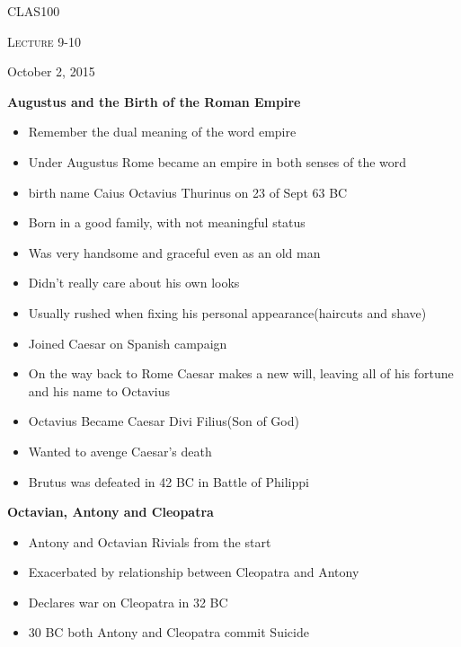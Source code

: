 \documentclass[12pt,a4paper]{report}
\begin{document}
	\centering
	{\scshape\LARGE CLAS100 \par}
	{\scshape\Large Lecture 9-10\par}
	{\large October 2, 2015}
	\vspace{1.5cm}

\textbf{Augustus and the Birth of the Roman Empire}
\begin{itemize}
\item Remember the dual meaning of the word empire
\item Under Augustus Rome became an empire in both senses of the word
\item birth name Caius Octavius Thurinus on 23 of Sept 63 BC
\item Born in a good family, with not meaningful status
\item Was very handsome and graceful even as an old man
\item Didn't really care about his own looks
\item Usually rushed when fixing his personal appearance(haircuts and shave)
\item Joined Caesar on Spanish campaign
\item On the way back to Rome Caesar makes a new will, leaving all of his fortune and his name to Octavius
\item Octavius Became Caesar Divi Filius(Son of God)
\item Wanted to avenge Caesar's death
\item Brutus was defeated in 42 BC in Battle of Philippi
\end{itemize}
\textbf{Octavian, Antony and Cleopatra}
\begin{itemize}
\item Antony and Octavian Rivials from the start
\item Exacerbated by relationship between Cleopatra and Antony
\item Declares war on Cleopatra in 32 BC
\item 30 BC both Antony and Cleopatra commit Suicide
\end{itemize}
\end{document}
